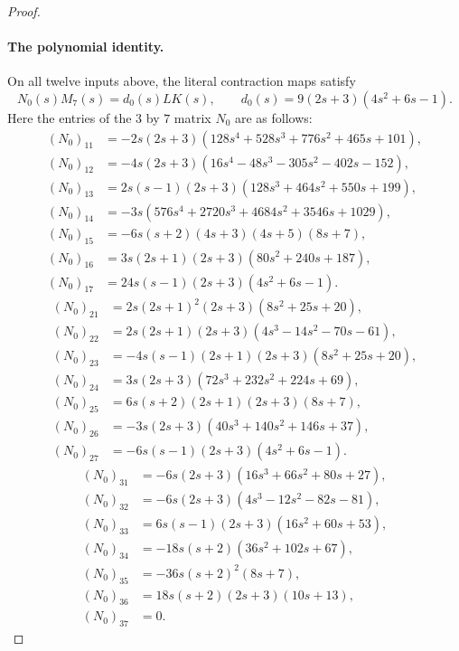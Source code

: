 \begin{proof}
\paragraph{The polynomial identity.}
On all twelve inputs above, the literal contraction maps
satisfy
\begin{equation}\label{eq:geometric-polynomial-identity}
 N_0(s)M_7(s)=d_0(s)LK(s),\qquad
 d_0(s)=9(2s+3)(4s^2+6s-1).
\end{equation}
Here the entries of the $3$ by $7$ matrix $N_0$ are as follows:
\begin{align*}
(N_0)_{11}&=-2s(2s+3)(128s^4+528s^3+776s^2+465s+101),\\
(N_0)_{12}&=-4s(2s+3)(16s^4-48s^3-305s^2-402s-152),\\
(N_0)_{13}&=2s(s-1)(2s+3)(128s^3+464s^2+550s+199),\\
(N_0)_{14}&=-3s(576s^4+2720s^3+4684s^2+3546s+1029),\\
(N_0)_{15}&=-6s(s+2)(4s+3)(4s+5)(8s+7),\\
(N_0)_{16}&=3s(2s+1)(2s+3)(80s^2+240s+187),\\
(N_0)_{17}&=24s(s-1)(2s+3)(4s^2+6s-1).
\end{align*}
\begin{align*}
(N_0)_{21}&=2s(2s+1)^2(2s+3)(8s^2+25s+20),\\
(N_0)_{22}&=2s(2s+1)(2s+3)(4s^3-14s^2-70s-61),\\
(N_0)_{23}&=-4s(s-1)(2s+1)(2s+3)(8s^2+25s+20),\\
(N_0)_{24}&=3s(2s+3)(72s^3+232s^2+224s+69),\\
(N_0)_{25}&=6s(s+2)(2s+1)(2s+3)(8s+7),\\
(N_0)_{26}&=-3s(2s+3)(40s^3+140s^2+146s+37),\\
(N_0)_{27}&=-6s(s-1)(2s+3)(4s^2+6s-1).
\end{align*}
\begin{align*}
(N_0)_{31}&=-6s(2s+3)(16s^3+66s^2+80s+27),\\
(N_0)_{32}&=-6s(2s+3)(4s^3-12s^2-82s-81),\\
(N_0)_{33}&=6s(s-1)(2s+3)(16s^2+60s+53),\\
(N_0)_{34}&=-18s(s+2)(36s^2+102s+67),\\
(N_0)_{35}&=-36s(s+2)^2(8s+7),\\
(N_0)_{36}&=18s(s+2)(2s+3)(10s+13),\\
(N_0)_{37}&=0.
\end{align*}


\end{proof}
